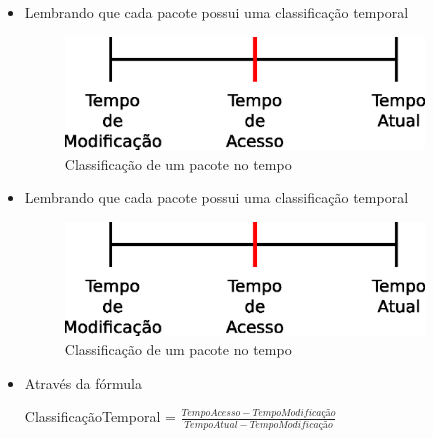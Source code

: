 \begin{frame}
\begin{itemize}
    \item Lembrando que cada pacote possui uma classificação temporal

    \begin{figure}[h]
      \centering
      \includegraphics[width=0.9\textwidth]{figura/barra_temporal_01.eps}
      \caption{Classificação de um pacote no tempo}
      \label{fig:barra_temporal}
    \end{figure}
\end{itemize}
\end{frame}

\begin{frame}
\begin{itemize}
    \item Lembrando que cada pacote possui uma classificação temporal

    \begin{figure}[h]
      \centering
      \includegraphics[width=0.9\textwidth]{figura/barra_temporal_01.eps}
      \caption{Classificação de um pacote no tempo}
      \label{fig:barra_temporal}
    \end{figure}

    \item Através da fórmula

    ClassificaçãoTemporal = $\frac{TempoAcesso - TempoModificação}{TempoAtual -
    TempoModificação}$
\end{itemize}
\end{frame}

